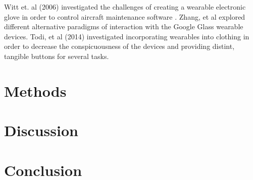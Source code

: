 \documentclass[12pt]{article}
\begin{document}
Witt et. al (2006) investigated the challenges of creating a wearable electronic glove in order to control aircraft maintenance software \cite{witt}. Zhang, et al explored different alternative paradigms of interaction with the Google Glass wearable devices. Todi, et al (2014) investigated incorporating wearables into clothing in order to decrease the conspicuousness of the devices and providing distint, tangible buttons for several tasks. 



\section{Methods}

\section{Discussion}

\section{Conclusion}




\end{document}
